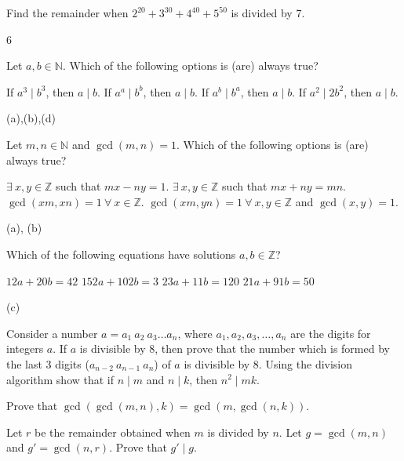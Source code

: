 \documentclass[12pt, answers, a4paper]{exam}
\begin{document}
\begin{questions}
\question[2] Find the remainder when $2^{20} + 3^{30} + 4^{40} + 5^{50}$ is divided by 7.
\begin{solution}
    6
\end{solution}
\question[2]  Let $a,b \in \mathbb{N}$. Which of the following options is (are) always true?
\begin{choices}
    \choice If $a^3 \mid b^3$, then $a \mid b$.
    \choice If $a^a \mid b^b$, then $a \mid b$.
    \choice If $a^b \mid b^a$, then $a \mid b$.
    \choice If $a^2 \mid 2b^2$, then $a \mid b$.
\end{choices}
\begin{solution}
    (a),(b),(d)
\end{solution}

\question[1] Let $m,n \in \mathbb{N}$ and $\gcd(m,n) = 1$. Which of the following options is (are) always true?
\begin{choices}
    \choice $\exists\ x, y \in \mathbb{Z}$ such that $mx - ny =1$.
    \choice $\exists\ x, y \in \mathbb{Z}$ such that $mx + ny = mn$.
    \choice $\gcd(xm, xn) = 1 \ \forall\ x \in \mathbb{Z}$. 
    \choice $\gcd(xm, yn) = 1\ \forall\ x,y \in \mathbb{Z}$ and $\gcd(x,y) =1$.
\end{choices}
\begin{solution}
    (a), (b)
\end{solution}

\question[2] Which of the following equations have solutions $a, b \in \mathbb{Z}$?
\begin{choices}

    \choice $12a + 20b = 42$
    \choice $152a + 102b = 3$
    \choice $23a + 11b = 120$
    \choice $21a + 91b = 50$
\end{choices}
\begin{solution}
    (c)
\end{solution}

\question[3] Consider a  number $a=a_1~a_2~a_3\hdots a_n$, where $a_1, a_2, a_3, \hdots , a_n$ are the digits for integers $a$. If $a$ is divisible by $8$, then prove that the number which is formed by the last 3 digits ($a_{n-2}~a_{n-1}~a_n$) of $a$ is divisible by 8.
\question[2] Using the division algorithm show that if $n \mid m$ and $n \mid k$, then $n^2\mid mk$.

\question[4] Prove that $\gcd(\gcd(m, n), k)=\gcd(m, \gcd(n, k))$.




\question[4] Let $r$ be the remainder obtained when $m$ is divided by $n$. Let  $g=\gcd(m, n)$ and $g'=\gcd(n, r)$. Prove that $g'\mid g$. 








\end{questions}
\end{document}
